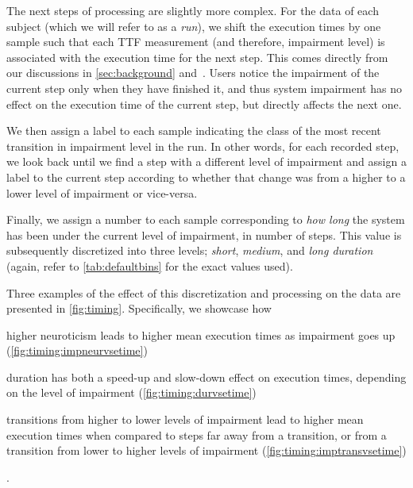 The next steps of processing are slightly more complex.
For the data of each subject (which we will refer to as a \emph{run}), we shift the execution times by one sample such that each \gls{TTF} measurement (and therefore, impairment level) is associated with the execution time for the next step.
This comes directly from our discussions in \cref{sec:background} and~\cite{olguinmunoz:impact2021}.
Users notice the impairment of the current step only when they have finished it, and thus system impairment has no effect on the execution time of the current step, but directly affects the next one.

We then assign a label to each sample indicating the class of the most recent transition in impairment level in the run.
In other words, for each recorded step, we look back until we find a step with a different level of impairment and assign a label to the current step according to whether that change was from a higher to a lower level of impairment or vice-versa.

Finally, we assign a number to each sample corresponding to \emph{how long} the system has been under the current level of impairment, in number of steps.
This value is subsequently discretized into three levels; \emph{short}, \emph{medium}, and \emph{long duration} (again, refer to \cref{tab:defaultbins} for the exact values used).

Three examples of the effect of this discretization and processing on the data are presented in \cref{fig:timing}.
Specifically, we showcase how
\begin{enumerate*}[itemjoin={{; }}, itemjoin*={{; and}}]
    \item higher neuroticism leads to higher mean execution times as impairment goes up (\cref{fig:timing:impneurvsetime})
    \item duration has both a speed-up and slow-down effect on execution times, depending on the level of impairment (\cref{fig:timing:durvsetime})
    \item transitions from higher to lower levels of impairment lead to higher mean execution times when compared to steps far away from a transition, or from a transition from lower to higher levels of impairment (\cref{fig:timing:imptransvsetime})
\end{enumerate*}.


